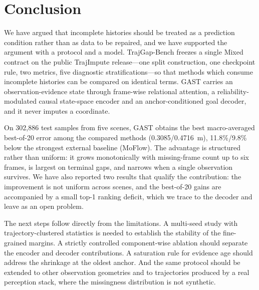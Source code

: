 \section{Conclusion}
\label{sec:concl}

We have argued that incomplete histories should be treated as a prediction condition rather than as data to be repaired, and we have supported the argument with a protocol and a model. TrajGap-Bench freezes a single Mixed contract on the public TrajImpute release---one split construction, one checkpoint rule, two metrics, five diagnostic stratifications---so that methods which consume incomplete histories can be compared on identical terms. GAST carries an observation-evidence state through frame-wise relational attention, a reliability-modulated causal state-space encoder and an anchor-conditioned goal decoder, and it never imputes a coordinate.

On 302{,}886 test samples from five scenes, GAST obtains the best macro-averaged best-of-20 error among the compared methods (0.3085/0.4716~m), 11.8\%/9.8\% below the strongest external baseline (MoFlow). The advantage is structured rather than uniform: it grows monotonically with missing-frame count up to six frames, is largest on terminal gaps, and narrows when a single observation survives. We have also reported two results that qualify the contribution: the improvement is not uniform across scenes, and the best-of-20 gains are accompanied by a small top-1 ranking deficit, which we trace to the decoder and leave as an open problem.

The next steps follow directly from the limitations. A multi-seed study with trajectory-clustered statistics is needed to establish the stability of the fine-grained margins. A strictly controlled component-wise ablation should separate the encoder and decoder contributions. A saturation rule for evidence age should address the shrinkage at the oldest anchor. And the same protocol should be extended to other observation geometries and to trajectories produced by a real perception stack, where the missingness distribution is not synthetic.
